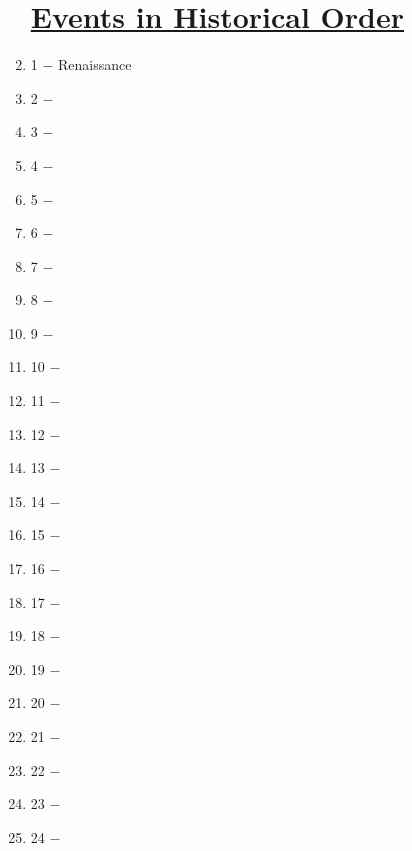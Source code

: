 \documentclass[12pt]{article}
\begin{document}
\begin{enumerate}
\begin{tabular}{l c c c c}
\end{tabular}

\section{\underline{Events in Historical Order}}

\item 1 $-$ Renaissance

\item 2 $-$ 

\item 3 $-$ 

\item 4 $-$ 

\item 5 $-$ 

\item 6 $-$ 

\item 7 $-$ 

\item 8 $-$ 

\item 9 $-$ 

\item 10 $-$ 

\item 11 $-$ 

\item 12 $-$ 

\item 13 $-$ 

\item 14 $-$ 

\item 15 $-$

\item 16 $-$ 

\item 17 $-$ 

\item 18 $-$ 

\item 19 $-$ 

\item 20 $-$ 

\item 21 $-$ 

\item 22 $-$ 

\item 23 $-$ 

\item 24 $-$ 


\end{enumerate}
\end{document}
